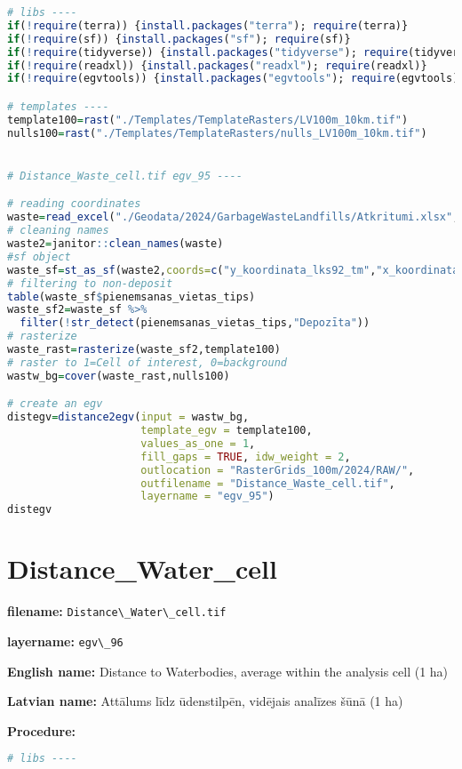 \documentclass[
]{book}
\newcommand{\passthrough}[1]{#1}
\begin{document}
\begin{lstlisting}[language=R]
# libs ----
if(!require(terra)) {install.packages("terra"); require(terra)}
if(!require(sf)) {install.packages("sf"); require(sf)}
if(!require(tidyverse)) {install.packages("tidyverse"); require(tidyverse)}
if(!require(readxl)) {install.packages("readxl"); require(readxl)}
if(!require(egvtools)) {install.packages("egvtools"); require(egvtools)}

# templates ----
template100=rast("./Templates/TemplateRasters/LV100m_10km.tif")
nulls100=rast("./Templates/TemplateRasters/nulls_LV100m_10km.tif")


# Distance_Waste_cell.tif egv_95 ----

# reading coordinates
waste=read_excel("./Geodata/2024/GarbageWasteLandfills/Atkritumi.xlsx",sheet="AtkritumuVietas")
# cleaning names
waste2=janitor::clean_names(waste)
#sf object
waste_sf=st_as_sf(waste2,coords=c("y_koordinata_lks92_tm","x_koordinata_lks92_tm"),crs=3059)
# filtering to non-deposit
table(waste_sf$pienemsanas_vietas_tips)
waste_sf2=waste_sf %>% 
  filter(!str_detect(pienemsanas_vietas_tips,"Depozīta"))
# rasterize
waste_rast=rasterize(waste_sf2,template100)
# raster to 1=Cell of interest, 0=background
wastw_bg=cover(waste_rast,nulls100)

# create an egv
distegv=distance2egv(input = wastw_bg,
                     template_egv = template100,
                     values_as_one = 1,
                     fill_gaps = TRUE, idw_weight = 2,
                     outlocation = "RasterGrids_100m/2024/RAW/",
                     outfilename = "Distance_Waste_cell.tif",
                     layername = "egv_95")
distegv
\end{lstlisting}

\section{Distance\_Water\_cell}\label{ch06.096}

\textbf{filename:} \passthrough{\lstinline!Distance\_Water\_cell.tif!}

\textbf{layername:} \passthrough{\lstinline!egv\_96!}

\textbf{English name:} Distance to Waterbodies, average within the analysis cell (1 ha)

\textbf{Latvian name:} Attālums līdz ūdenstilpēn, vidējais analīzes šūnā (1 ha)

\textbf{Procedure:}

\begin{lstlisting}[language=R]
# libs ----
\end{lstlisting}
\end{document}
